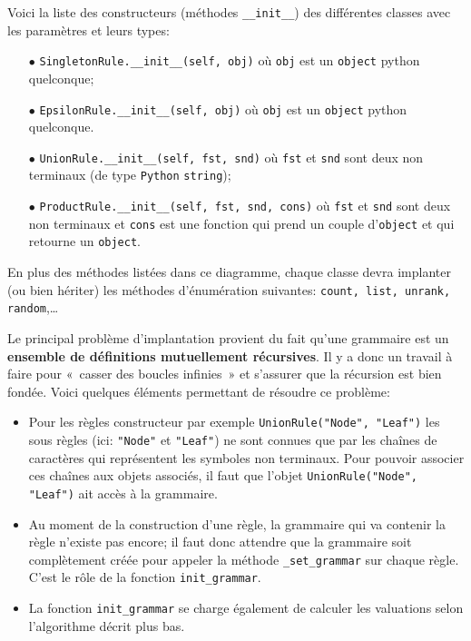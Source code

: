 \documentclass[11pt]{article}
\renewcommand{\emph}[1]{\textbf{#1}}
\newcommand{\Python}{\texttt{Python}}
\begin{document}
Voici la liste des  constructeurs (méthodes \verb+__init__+) des différentes
classes avec les paramètres et leurs types:
\begin{itemize}
\item[$\bullet$] \verb+SingletonRule.__init__(self, obj)+ où \texttt{obj} est
  un \texttt{object} python quelconque;
\item[$\bullet$] \verb+EpsilonRule.__init__(self, obj)+ où \texttt{obj} est un
  \texttt{object} python quelconque.
\item[$\bullet$] \verb+UnionRule.__init__(self, fst, snd)+ où \texttt{fst} et
  \texttt{snd} sont deux non terminaux (de type \Python{} \texttt{string});
\item[$\bullet$] \verb+ProductRule.__init__(self, fst, snd, cons)+ où
  \texttt{fst} et \texttt{snd} sont deux non terminaux et \texttt{cons} est
  une fonction qui prend un couple d'\texttt{object} et qui retourne un
  \texttt{object}.
\end{itemize}
\bigskip

En plus des méthodes listées dans ce diagramme, chaque classe devra implanter
(ou bien hériter) les méthodes d'énumération suivantes: \texttt{count, list, unrank, random},\dots

\medskip

Le principal problème d'implantation provient du fait qu'une grammaire est un
\emph{ensemble de définitions mutuellement récursives}. Il y a donc un travail
à faire pour «~casser des boucles infinies~» et s'assurer que la récursion est
bien fondée. Voici quelques éléments permettant de résoudre ce problème:
\begin{itemize}
\item Pour les règles constructeur par exemple
  \verb+UnionRule("Node", "Leaf")+ les sous règles (ici: \verb+"Node"+ et
  \verb+"Leaf"+) ne sont connues que par les chaînes de caractères qui
  représentent les symboles non terminaux. Pour pouvoir associer ces chaînes
  aux objets associés, il faut que l'objet \verb+UnionRule("Node", "Leaf")+
  ait accès à la grammaire.
\item Au moment de la construction d'une règle, la grammaire qui va contenir
  la règle n'existe pas encore; il faut donc attendre que la grammaire soit
  complètement créée pour appeler la méthode \texttt{\_set\_grammar} sur
  chaque règle. C'est le rôle de la fonction \texttt{init\_grammar}.
\item La fonction \texttt{init\_grammar} se charge également de calculer les
  valuations selon l'algorithme décrit plus bas.
\end{itemize}
\medskip
\end{document}
